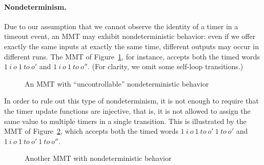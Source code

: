 \paragraph{Nondeterminism.}
Due to our assumption that we cannot observe the identity of a timer in a timeout event, an MMT may exhibit nondeterministic
behavior: even if we offer exactly the same inputs at exactly the same time, different outputs may occur in different runs. 
The MMT of Figure~\ref{fig:nondeterminism}, for instance, accepts both the timed words
$1 ~ i ~ o ~ 1 ~ \mathit{to} ~ o'$ and $1 ~ i ~ o ~ 1 ~ \mathit{to} ~ o''$.
(For clarity, we omit some self-loop transitions.)
\begin{figure}[ht]
\vspace{-2em}
\begin{center}
\caption{An MMT with ``uncontrollable'' nondeterministic behavior}
\label{fig:nondeterminism}
\end{center}
\end{figure}
\iflong
In order to rule out this type of nondeterminism, it is not enough to require that the timer update functions are injective,
that is, it is not allowed to assign the same value to multiple timers in a single transition.
This is illustrated by the MMT of Figure~\ref{fig:nondeterminism2}, which accepts both the timed words
$1 ~ i ~ o ~ 1 ~ \mathit{to} ~ o'~ 1 ~ \mathit{to} ~ o'$ and $1 ~ i ~ o ~ 1 ~ \mathit{to} ~ o' ~ 1 ~ \mathit{to} ~ o''$.
\begin{figure}[ht]
\begin{center}
\caption{Another MMT with nondeterministic behavior}
\label{fig:nondeterminism2}
\end{center}
\end{figure}
